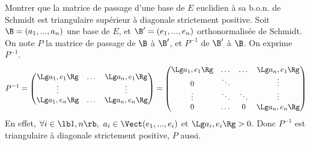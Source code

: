 \documentclass[french, 11pt]{article}
\begin{document}
\vspace*{-0.8cm}

\begin{question}{}{}
    Montrer que la matrice de passage d'une base de $E$ euclidien à sa b.o.n. de Schmidt est triangulaire supérieur à diagonale strictement positive.
    \tcblower
    Soit $\B=(a_1,...,a_n)$ une base de $E$, et $\B'=(e_1,...,e_n)$ orthonormalisée de Schmidt.\\
    On note $P$ la matrice de passage de $\B$ à $\B'$, et $P^{-1}$ de $\B'$ à $\B$. On exprime $P^{-1}$.
    \begin{equation*}
        P^{-1} = \begin{pmatrix} \Lg a_1, e_1 \Rg & \dots & \Lg a_n, e_1 \Rg \\ \vdots & & \vdots \\ \Lg a_1, e_n \Rg & \dots & \Lg a_n, e_n \Rg\end{pmatrix} = \begin{pmatrix}\Lg a_1, e_1 \Rg & \dots & \dots & \Lg a_n, e_1\Rg \\ 0 & \ddots & & \vdots \\ \vdots & \ddots & \ddots & \vdots \\ 0 & \dots & 0 & \Lg a_n, e_n \Rg \end{pmatrix}
    \end{equation*}
    En effet, $\forall i \in \lb1,n\rb, ~ a_i \in \Vect(e_1,...,e_i)$ et $\Lg a_i, e_i \Rg > 0$. Donc $P^{-1}$ est triangulaire à diagonale strictement positive, $P$ aussi.
\end{question}

\vspace*{-0.8cm}
\end{document}
